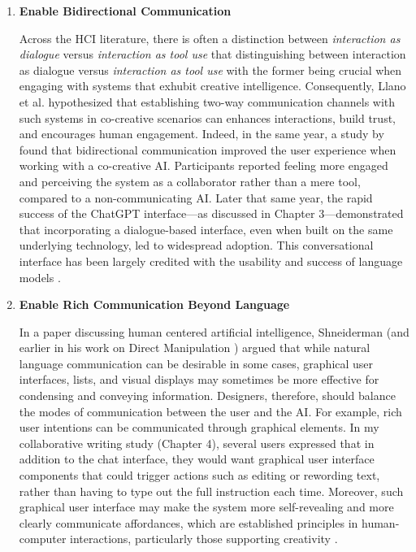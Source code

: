 \begin{enumerate}

\item \textbf{Enable Bidirectional Communication}
    

Across the HCI literature, there is often a distinction between \textit{interaction as dialogue} versus \textit{interaction as tool use} that distinguishing between interaction as dialogue versus \textit{interaction as tool use} \cite{Hornbaek2017-wg}  with the former being crucial when engaging with systems that exhubit creative intelligence. Consequently, Llano et al. \cite{Llano2022-ti} hypothesized that establishing two-way communication channels with such systems in co-creative scenarios can enhances interactions, build trust, and encourages human engagement. 
Indeed, in the same year, a study by \cite{Rezwana2022-ui} found that bidirectional communication improved the user experience when working with a co-creative AI. Participants reported feeling more engaged and perceiving the system as a collaborator rather than a mere tool, compared to a non-communicating AI.
Later that same year, the rapid success of the ChatGPT interface—as discussed in Chapter 3—demonstrated that incorporating a dialogue-based interface, even when built on the same underlying technology, led to widespread adoption. This conversational interface has been largely credited with the usability and success of language models \cite{SXSW2023-wg}.
   
    
\item \textbf{Enable Rich Communication Beyond Language}

In a paper discussing human centered artificial intelligence, Shneiderman \cite{Shneiderman2020-ue} (and earlier in his work on Direct Manipulation \cite{Shneiderman1997-tv}) argued that while natural language communication can be desirable in some cases, graphical user interfaces, lists, and visual displays may sometimes be more effective for condensing and conveying information. Designers, therefore, should balance the modes of communication between the user and the AI. For example, rich user intentions can be communicated through graphical elements. In my collaborative writing study (Chapter 4), several users expressed that in addition to the chat interface, they would want graphical user interface components that could trigger actions such as editing or rewording text, rather than having to type out the full instruction each time. Moreover, such graphical user interface may make the system more self-revealing and more clearly communicate affordances, which are established principles in human-computer interactions, particularly those supporting creativity \cite{Norman1994-kz, Resnick2005-fs}.


\end{enumerate}
